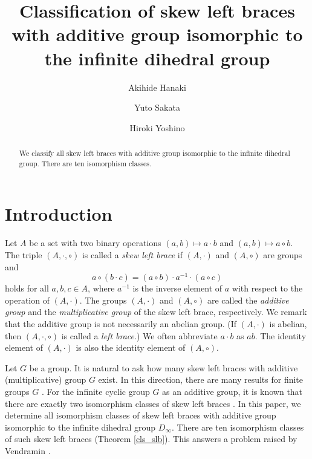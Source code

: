 \documentclass[12pt]{amsart}
\theoremstyle{definition}
\newcommand{\ci}{\circ}
\begin{document}
\title[Classification of skew left braces]
{Classification of skew left braces with additive group
  isomorphic to the infinite dihedral group}

\author[A. Hanaki]{Akihide Hanaki}
\address{Faculty of Science, Shinshu University,
  Matsumoto 3-1-1, 390-8621, Japan}

\author[Y. Sakata]{Yuto Sakata}
\address{1-6-35 Miyanomori, Muroran,
  Hokkaido, 050-0073, Japan}

\author[H. Yoshino]{Hiroki Yoshino}
\address{2642 Okitsu, Katsuura, Chiba 299-5245, Japan}

\begin{abstract}
  We classify all skew left braces with additive group
  isomorphic to the infinite dihedral group.
  There are ten isomorphism classes.
\end{abstract}

\maketitle

\section{Introduction}
Let $A$ be a set with two binary operations
$(a,b)\mapsto a\cdot b$ and $(a,b)\mapsto a \ci b$.
The triple $(A,\cdot,\ci)$ is called a \emph{skew left brace} if
$(A,\cdot)$ and $(A,\ci)$ are groups and
$$a\ci(b\cdot c)=(a\ci b)\cdot a^{-1} \cdot (a\ci c)$$
holds for all $a,b,c\in A$,
where $a^{-1}$ is the inverse element of $a$
with respect to the operation of $(A,\cdot)$.
The groups $(A,\cdot)$ and $(A,\ci)$ are called the \emph{additive group}
and the \emph{multiplicative group} of the skew left brace, respectively.
We remark that the additive group is not necessarily an abelian group.
(If $(A,\cdot)$ is abelian, then $(A,\cdot,\ci)$ is called a \emph{left brace}.)
We often abbreviate $a\cdot b$ as $ab$.
The identity element of $(A,\cdot)$ is also the identity element of $(A,\ci)$.

Let $G$ be a group.
It is natural to ask how many skew left braces with additive (multiplicative) group $G$ exist.
In this direction, there are many results for finite groups $G$
\cite{MR4414157, MR4391827, MR4815260, MR4678589, MR4113853,
  MR4513787, MR4950651, MR3647970}.
For the infinite cyclic group $G$ as an additive group,
it is known that there are exactly two isomorphism
classes of skew left braces \cite[Proof of Proposition 6]{MR2298848}.
In this paper, we determine all isomorphism classes of skew left braces
with additive group isomorphic to the infinite dihedral group $D_\infty$.
There are ten isomorphism classes of such skew left braces
(Theorem \ref{cls_slb}).
This answers a problem raised by Vendramin
\cite[after Problem 2.27]{MR3974481}.
\end{document}
